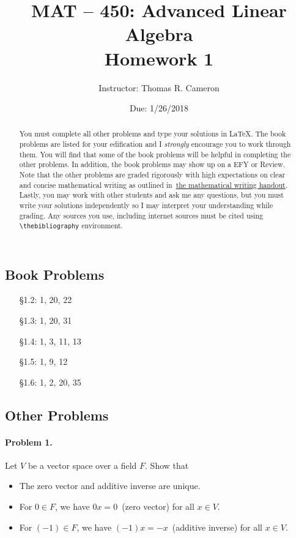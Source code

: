\documentclass{article}
\title{MAT -- 450: Advanced Linear Algebra\\
\large{Homework 1}}
\author{Instructor: Thomas R. Cameron}
\date{Due: 1/26/2018}
\begin{document}
\maketitle

\begin{abstract}
You must complete all other problems and type your solutions in \LaTeX. The book problems are listed for your edification and I \emph{strongly} encourage you to work through them. You will find that some of the book problems will be helpful in completing the other problems. In addition, the book problems may show up on a EFY or Review. Note that the other problems are graded rigorously with high expectations on clear and concise mathematical writing as outlined in~\href{https://www.thomasrcameron.com/courses/MAT-450/handouts/math_writing.pdf}{the mathematical writing handout}. Lastly, you may work with other students and ask me any questions, but you must write your solutions independently so I may interpret your understanding while grading. Any sources you use, including internet sources must be cited using {\verb+\thebibliography+} environment. 
\end{abstract}

\subsection*{Book Problems}
\begin{itemize}
\item   [\S 1.2:] 1, 20, 22
\item   [\S 1.3:] 1, 20, 31
\item   [\S 1.4:] 1, 3, 11, 13
\item   [\S 1.5:] 1, 9, 12
\item   [\S 1.6:] 1, 2, 20, 35
\end{itemize}

\subsection*{Other Problems}

\paragraph*{Problem 1.}	Let $V$ be a vector space over a field $F$. Show that
\begin{itemize}
\item	The zero vector and additive inverse are unique.
\item	For $0\in F$, we have $0x=0$~(zero vector) for all $x\in V$. 
\item	For $(-1)\in F$, we have $(-1)x=-x$~(additive inverse) for all $x\in V$.
\end{itemize}
\end{document}

